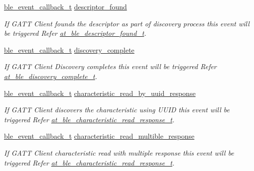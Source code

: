 \begin{DoxyCompactItemize}
\mbox{\hyperlink{ble__manager_8h_a04ce4bb8cb8282f2762e3924b1773cc9}{ble\+\_\+event\+\_\+callback\+\_\+t}} \mbox{\hyperlink{structble__gatt__client__event__cb_ae157e3403e4de753657b55d39bb08277}{descriptor\+\_\+found}}
\begin{DoxyCompactList}\small\item\em If G\+A\+TT Client founds the descriptor as part of discovery process this event will be triggered Refer \mbox{\hyperlink{structat__ble__descriptor__found__t}{at\+\_\+ble\+\_\+descriptor\+\_\+found\+\_\+t}}. \end{DoxyCompactList}\item 
\mbox{\hyperlink{ble__manager_8h_a04ce4bb8cb8282f2762e3924b1773cc9}{ble\+\_\+event\+\_\+callback\+\_\+t}} \mbox{\hyperlink{structble__gatt__client__event__cb_a849ea337025d6a2fabe329864aa7f3aa}{discovery\+\_\+complete}}
\begin{DoxyCompactList}\small\item\em If G\+A\+TT Client Discovery completes this event will be triggered Refer \mbox{\hyperlink{at__ble__api_8h_ad6fbc03cf1f09d166dd381a805a42e9c}{at\+\_\+ble\+\_\+discovery\+\_\+complete\+\_\+t}}. \end{DoxyCompactList}\item 
\mbox{\hyperlink{ble__manager_8h_a04ce4bb8cb8282f2762e3924b1773cc9}{ble\+\_\+event\+\_\+callback\+\_\+t}} \mbox{\hyperlink{structble__gatt__client__event__cb_aa0e76a1ad0f3e798ea31ff98ba213309}{characteristic\+\_\+read\+\_\+by\+\_\+uuid\+\_\+response}}
\begin{DoxyCompactList}\small\item\em If G\+A\+TT Client discovers the characteristic using U\+U\+ID this event will be triggered Refer \mbox{\hyperlink{structat__ble__characteristic__read__response__t}{at\+\_\+ble\+\_\+characteristic\+\_\+read\+\_\+response\+\_\+t}}. \end{DoxyCompactList}\item 
\mbox{\hyperlink{ble__manager_8h_a04ce4bb8cb8282f2762e3924b1773cc9}{ble\+\_\+event\+\_\+callback\+\_\+t}} \mbox{\hyperlink{structble__gatt__client__event__cb_add8b50999d393179e93d19c3bd15defd}{characteristic\+\_\+read\+\_\+multible\+\_\+response}}
\begin{DoxyCompactList}\small\item\em If G\+A\+TT Client characteristic read with multiple response this event will be triggered Refer \mbox{\hyperlink{structat__ble__characteristic__read__response__t}{at\+\_\+ble\+\_\+characteristic\+\_\+read\+\_\+response\+\_\+t}}. \end{DoxyCompactList}\item 

\end{DoxyCompactItemize}

